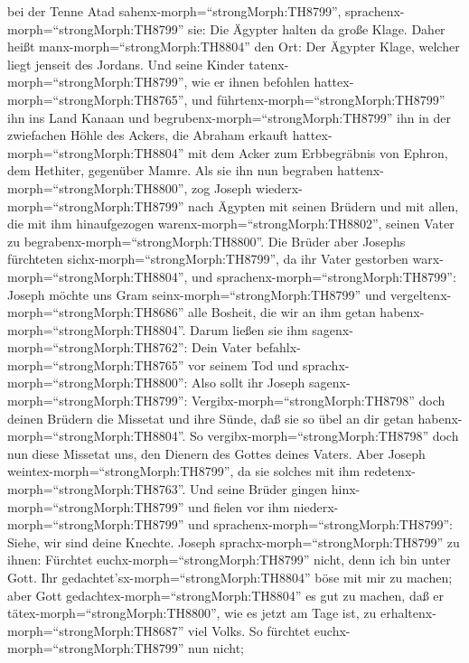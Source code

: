 bei der Tenne Atad sahenx-morph=``strongMorph:TH8799'',
sprachenx-morph=``strongMorph:TH8799'' sie: Die Ägypter halten da große
Klage. Daher heißt manx-morph=``strongMorph:TH8804'' den Ort: Der
Ägypter Klage, welcher liegt jenseit des Jordans.  Und
seine Kinder tatenx-morph=``strongMorph:TH8799'', wie er ihnen befohlen
hattex-morph=``strongMorph:TH8765'',  und
führtenx-morph=``strongMorph:TH8799'' ihn ins Land Kanaan und
begrubenx-morph=``strongMorph:TH8799'' ihn in der zwiefachen Höhle des
Ackers, die Abraham erkauft hattex-morph=``strongMorph:TH8804'' mit dem
Acker zum Erbbegräbnis von Ephron, dem Hethiter, gegenüber Mamre.
 Als sie ihn nun begraben
hattenx-morph=``strongMorph:TH8800'', zog Joseph
wiederx-morph=``strongMorph:TH8799'' nach Ägypten mit seinen Brüdern und
mit allen, die mit ihm hinaufgezogen
warenx-morph=``strongMorph:TH8802'', seinen Vater zu
begrabenx-morph=``strongMorph:TH8800''.  Die Brüder aber
Josephs fürchteten sichx-morph=``strongMorph:TH8799'', da ihr Vater
gestorben warx-morph=``strongMorph:TH8804'', und
sprachenx-morph=``strongMorph:TH8799'': Joseph möchte uns Gram
seinx-morph=``strongMorph:TH8799'' und
vergeltenx-morph=``strongMorph:TH8686'' alle Bosheit, die wir an ihm
getan habenx-morph=``strongMorph:TH8804''.  Darum ließen
sie ihm sagenx-morph=``strongMorph:TH8762'': Dein Vater
befahlx-morph=``strongMorph:TH8765'' vor seinem Tod und
sprachx-morph=``strongMorph:TH8800'':  Also sollt ihr
Joseph sagenx-morph=``strongMorph:TH8799'':
Vergibx-morph=``strongMorph:TH8798'' doch deinen Brüdern die Missetat
und ihre Sünde, daß sie so übel an dir getan
habenx-morph=``strongMorph:TH8804''. So
vergibx-morph=``strongMorph:TH8798'' doch nun diese Missetat uns, den
Dienern des Gottes deines Vaters. Aber Joseph
weintex-morph=``strongMorph:TH8799'', da sie solches mit ihm
redetenx-morph=``strongMorph:TH8763''.  Und seine Brüder
gingen hinx-morph=``strongMorph:TH8799'' und fielen vor ihm
niederx-morph=``strongMorph:TH8799'' und
sprachenx-morph=``strongMorph:TH8799'': Siehe, wir sind deine Knechte.
 Joseph sprachx-morph=``strongMorph:TH8799'' zu ihnen:
Fürchtet euchx-morph=``strongMorph:TH8799'' nicht, denn ich bin unter
Gott.  Ihr gedachtet'sx-morph=``strongMorph:TH8804'' böse
mit mir zu machen; aber Gott gedachtex-morph=``strongMorph:TH8804'' es
gut zu machen, daß er tätex-morph=``strongMorph:TH8800'', wie es jetzt
am Tage ist, zu erhaltenx-morph=``strongMorph:TH8687'' viel Volks.
 So fürchtet euchx-morph=``strongMorph:TH8799'' nun nicht;

